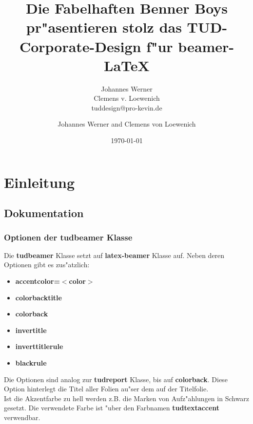 \documentclass[accentcolor=tud1a,colorbacktitle,inverttitle,landscape,german,presentation,t]{tudbeamer}
\begin{document}
\title[Fabelhafte Benner Boys]{Die Fabelhaften Benner Boys pr"asentieren
stolz das TUD-Corporate-Design f"ur beamer-\LaTeX}
\subtitle{Johannes Werner\\Clemens v. Loewenich\\tuddesign@pro-kevin.de}

\author[J. Werner et al.]{Johannes Werner and Clemens von Loewenich}


\date{\today}

\begin{titleframe}
\end{titleframe}

\section{Einleitung}
	
	\subsection{Dokumentation}
		\begin{frame}
		  \frametitle{Optionen der \textbf{tudbeamer} Klasse}
			Die \textbf{tudbeamer} Klasse setzt auf
			\textbf{latex-beamer} Klasse auf. Neben deren
			Optionen gibt es zus"atzlich:
		  \begin{itemize}
			\item \textbf{accentcolor=$<$color$>$}
			\item \textbf{colorbacktitle}
			\item \textbf{colorback}
			\item \textbf{invertitle}
			\item \textbf{inverttitlerule}
			\item \textbf{blackrule}
		  \end{itemize}
			Die Optionen sind analog zur \textbf{tudreport} Klasse, bis auf \textbf{colorback}. 
			Diese Option hinterlegt die Titel aller Folien au"ser dem auf der Titelfolie.\\
			\vfill
			Ist die Akzentfarbe zu hell werden z.B. die Marken von
			Aufz"ahlungen in Schwarz gesetzt. Die verwendete
			Farbe ist "uber den Farbnamen \alert{\bf tudtextaccent}
			verwendbar.
		\end{frame}
\end{document}
